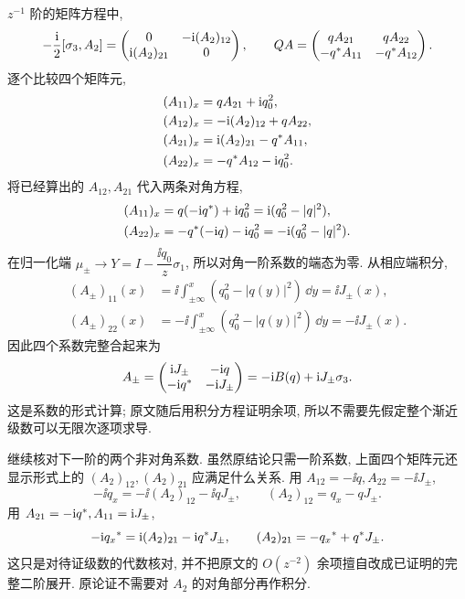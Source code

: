 $z^{-1}$ 阶的矩阵方程中,
\begin{equation*}
-\dfrac{\mathrm{i}}{2}[\sigma_3,A_2]
=\begin{pmatrix}0&-\mathrm{i}(A_2)_{12}\\
\mathrm{i}(A_2)_{21}&0\end{pmatrix},
\qquad
QA=\begin{pmatrix}
qA_{21}&qA_{22}\\-{q}^{*}A_{11}&-{q}^{*}A_{12}
\end{pmatrix}.
\end{equation*}
逐个比较四个矩阵元,
\begin{align*}
(A_{11})_x&=qA_{21}+\mathrm{i} q_0^2,\\
(A_{12})_x&=-\mathrm{i}(A_2)_{12}+qA_{22},\\
(A_{21})_x&=\mathrm{i}(A_2)_{21}-{q}^{*}A_{11},\\
(A_{22})_x&=-{q}^{*}A_{12}-\mathrm{i} q_0^2.
\end{align*}
将已经算出的 $A_{12},A_{21}$ 代入两条对角方程,
\begin{align*}
(A_{11})_x
&=q(-\mathrm{i}{q}^{*})+\mathrm{i} q_0^2
=\mathrm{i}(q_0^2-|q|^2),\\
(A_{22})_x
&=-{q}^{*}(-\mathrm{i} q)-\mathrm{i} q_0^2
=-\mathrm{i}(q_0^2-|q|^2).
\end{align*}
在归一化端 $\mu_\pm\to Y=I-\dfrac{\ii q_0}{z}\sigma_1$,
所以对角一阶系数的端态为零.
从相应端积分,
\begin{align*}
(A_\pm)_{11}(x)
&=\ii\int_{\pm\infty}^{x}(q_0^2-|q(y)|^2)\,\dd y
=\ii J_\pm(x),\\
(A_\pm)_{22}(x)
&=-\ii\int_{\pm\infty}^{x}(q_0^2-|q(y)|^2)\,\dd y
=-\ii J_\pm(x).
\end{align*}
因此四个系数完整合起来为
\begin{equation*}
A_\pm=\begin{pmatrix}
\mathrm{i} J_\pm&-\mathrm{i} q\\-\mathrm{i}{q}^{*}&-\mathrm{i} J_\pm
\end{pmatrix}
=-\mathrm{i} B(q)+\mathrm{i} J_\pm\sigma_3.
\end{equation*}
这是系数的形式计算; 原文随后用积分方程证明余项,
所以不需要先假定整个渐近级数可以无限次逐项求导.

\par\smallskip\noindent 继续核对下一阶的两个非对角系数.\quad
虽然原结论只需一阶系数, 上面四个矩阵元还显示形式上的
$(A_2)_{12},(A_2)_{21}$ 应满足什么关系.
用 $A_{12}=-\ii q,A_{22}=-\ii J_\pm$,
\begin{equation*}
-\ii q_x=-\ii(A_2)_{12}-\ii qJ_\pm,
\qquad (A_2)_{12}=q_x-qJ_\pm.
\end{equation*}
用 $A_{21}=-\mathrm{i}{q}^{*},A_{11}=\mathrm{i} J_\pm$,
\begin{equation*}
-\mathrm{i}{q_x}^{*}=\mathrm{i}(A_2)_{21}-\mathrm{i}{q}^{*}J_\pm,
\qquad (A_2)_{21}=-{q_x}^{*}+{q}^{*}J_\pm.
\end{equation*}
这只是对待证级数的代数核对, 并不把原文的
$O(z^{-2})$ 余项擅自改成已证明的完整二阶展开.
原论证不需要对 $A_2$ 的对角部分再作积分.

